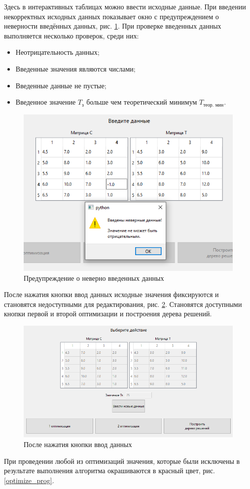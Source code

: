 	Здесь в интерактивных таблицах можно ввести исходные данные. При введении некорректных исходных данных показывает окно с предупреждением о неверности введённых данных, рис. \ref{prog2}. При проверке введенных данных выполняется несколько проверок, среди них:
	\begin{itemize}
		\item Неотрицательность данных;
		\item Введенные значения являются числами;
		\item Введенные данные не пустые;
		\item Введенное значение $T_\text{з}$ больше чем теоретический минимум $T_\text{теор. мин}$.
	\end{itemize}
	
	\begin{figure}
		\centering\includegraphics[width=.4\textwidth]{png/prog2.png}
		\caption{Предупреждение о неверно введенных данных}
		\label{prog2}
	\end{figure}
	
	После нажатия кнопки ввод данных исходные значения фиксируются и становятся недоступными для редактирования, рис. \ref{prog3}. Становятся доступными кнопки первой и второй оптимизации и построения дерева решений.
	
	\begin{figure}
		\centering\includegraphics[width=.5\textwidth]{png/prog3.png}
		\caption{После нажатия кнопки ввод данных}
		\label{prog3}
	\end{figure}

	При проведении любой из оптимизаций значения, которые были исключены в результате выполнения алгоритма окрашиваются в красный цвет, рис. \ref{optimize_prog}.
	
